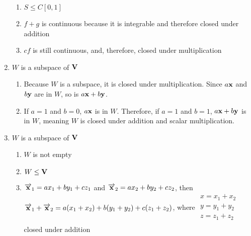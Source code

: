 \documentclass[12pt]{article}
\begin{document}
\begin{enumerate}
\begin{enumerate}
      \item $S\leq C[0,1]$ \textcolor{green}{\checkmark}

      \item $f+g$ is continuous because it is integrable and therefore closed under addition\textcolor{green}{\checkmark}

      \item $cf$ is still continuous, and, therefore, closed under multiplication \textcolor{green}{\checkmark}

    \end{enumerate}

    \setcounter{enumi}{50}

  \item $W$ is a subspace of $\bold{V}$

    \begin{enumerate}

      \item Because $W$ is a subspace, it is closed under multiplication. Since $a\bold{x}$ and $b\bold{y}$ are in $W$, so is $a\bold{x}+b\bold{y}$.

      \item If $a=1$ and $b=0$, $a\bold{x}$ is in $W$. Therefore, if $a=1$ and $b=1$, $a\bold{x}+b\bold{y}$ is in $W$, meaning $W$ is closed under addition and scalar multiplication.

    \end{enumerate}

  \item $W$ is a subspace of $\bold{V}$

    \begin{enumerate}

      \item $W$ is not empty \textcolor{green}{\checkmark}

      \item $W\leq \bold{V}$ \textcolor{green}{\checkmark}

      \item $\overrightarrow{\bold{x}}_1=ax_1+by_1+cz_1$ and $\overrightarrow{\bold{x}}_2=ax_2+by_2+cz_2$, then $\overrightarrow{\bold{x}}_1+\overrightarrow{\bold{x}}_2=a(x_1+x_2)+b(y_1+y_2)+c(z_1+z_2)$, where $\begin{array}{c} x=x_1+x_2\\y=y_1+y_2\\z=z_1+z_2\\\end{array}$ closed under addition \textcolor{green}{\checkmark}


\end{enumerate}
\end{enumerate}
\end{document}
